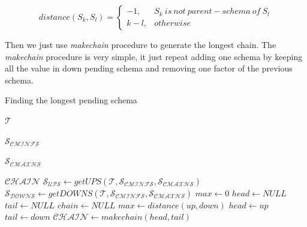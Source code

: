 \documentclass[10pt,journal,cspaper,compsoc]{IEEEtran}
\begin{document}
$$distance(S_k, S_l) =
\begin{cases}
-1, & S_k\ is\ not\ parent-schema\ of\ S_l\\
k-l,& otherwise
\end{cases}
$$

Then we just use \emph{makechain} procedure to generate the longest chain. The \emph{makechain} procedure is very simple, it just repeat adding one schema by keeping all the value in down pending schema and removing one factor of the previous schema.

\begin{algorithm}
  \caption{Finding the longest pending schema}
  \begin{algorithmic}[1]
     \Require  $\mathcal{T}$ 

     $\mathcal{S_{CMINFS}}$ 

     $\mathcal{S_{CMAXHS}}$ 

     \Ensure  $\mathcal{CHAIN}$ 
    \State $\mathcal{S_{UPS}} \leftarrow getUPS(\mathcal{T},\mathcal{S_{CMINFS}},\mathcal{S_{CMAXHS}}) $
    \State $\mathcal{S_{DOWNS}} \leftarrow getDOWNS(\mathcal{T},\mathcal{S_{CMINFS}},\mathcal{S_{CMAXHS}}) $
    \State $max \leftarrow 0$
    \State $head \leftarrow NULL $
    \State $tail \leftarrow NULL $
    \State $chain \leftarrow NULL $
              \State $max \leftarrow distance(up, down)$
              \State $head \leftarrow up$
              \State $tail \leftarrow down$
             \EndIf
        \EndFor
     \EndFor
     \State $\mathcal{CHAIN} \leftarrow  makechain(head, tail)$
  \end{algorithmic}
\end{algorithm}
\end{document}
